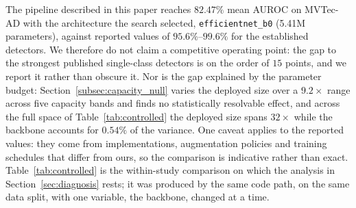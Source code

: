 \begin{table}[t]
\centering
\caption{Controlled comparison: every backbone of the search space trained on
every MVTec-AD category under an identical protocol (500 epochs, batch size 64,
seed 42, ResNet-18 teacher, reverse distillation; 210 detectors). Deployed size is
the student encoder plus decoder. The manuscript's selected architecture is marked
with~$\dagger$.}
\label{tab:controlled}

\end{table}

The pipeline described in this paper reaches $82.47\%$ mean AUROC on MVTec-AD with
the architecture the search selected, \texttt{efficientnet\_b0} (5.41M parameters),
against reported values of $95.6\%$--$99.6\%$ for the established detectors. We
therefore do not claim a competitive operating point: the gap to the strongest
published single-class detectors is on the order of $15$ points, and we report it
rather than obscure it. Nor is the gap explained by the parameter budget:
Section~\ref{subsec:capacity_null} varies the deployed size over a $9.2\times$
range across five capacity bands and finds no statistically resolvable effect, and
across the full space of Table~\ref{tab:controlled} the deployed size spans
$32\times$ while the backbone accounts for $0.54\%$ of the variance. One caveat
applies to the reported values: they come from implementations, augmentation
policies and training schedules that differ from ours, so the comparison is
indicative rather than exact. Table~\ref{tab:controlled} is the within-study
comparison on which the analysis in Section~\ref{sec:diagnosis} rests; it was
produced by the same code path, on the same data split, with one variable, the
backbone, changed at a time.

